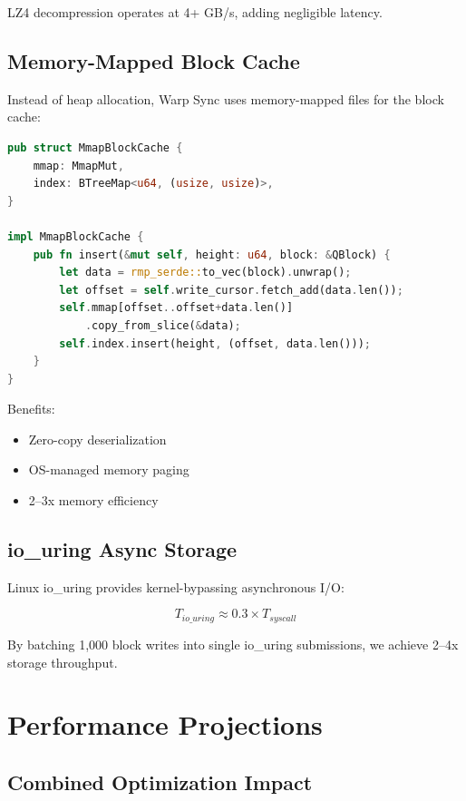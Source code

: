 \documentclass[11pt,a4paper]{article}
\begin{document}
LZ4 decompression operates at 4+ GB/s, adding negligible latency.

\subsection{Memory-Mapped Block Cache}

Instead of heap allocation, Warp Sync uses memory-mapped files for the block cache:

\begin{lstlisting}[language=Rust,caption={Memory-mapped cache implementation}]
pub struct MmapBlockCache {
    mmap: MmapMut,
    index: BTreeMap<u64, (usize, usize)>,
}

impl MmapBlockCache {
    pub fn insert(&mut self, height: u64, block: &QBlock) {
        let data = rmp_serde::to_vec(block).unwrap();
        let offset = self.write_cursor.fetch_add(data.len());
        self.mmap[offset..offset+data.len()]
            .copy_from_slice(&data);
        self.index.insert(height, (offset, data.len()));
    }
}
\end{lstlisting}

Benefits:
\begin{itemize}
    \item Zero-copy deserialization
    \item OS-managed memory paging
    \item 2--3x memory efficiency
\end{itemize}

\subsection{io\_uring Async Storage}

Linux io\_uring provides kernel-bypassing asynchronous I/O:

\begin{equation}
T_{io\_uring} \approx 0.3 \times T_{syscall}
\end{equation}

By batching 1,000 block writes into single io\_uring submissions, we achieve 2--4x storage throughput.

\section{Performance Projections}

\subsection{Combined Optimization Impact}
\end{document}

